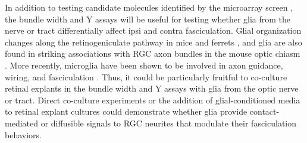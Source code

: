 In addition to testing candidate molecules identified by the microarray screen \cite{wang2016ipsilateral}, the bundle width and Y assays will be useful for testing whether glia from the nerve or tract differentially affect ipsi and contra fasciculation.
Glial organization changes along the retinogeniculate pathway in mice \cite{colello1992observations} and ferrets \cite{guillery1987changing}, and glia are also found in striking associations with RGC axon bundles in the mouse optic chiasm \cite{colello1998changing}.
More recently, microglia have been shown to be involved in axon guidance, wiring, and fasciculation \cite{squarzoni2014microglia,pont2014microglia}.
Thus, it could be particularly fruitful to co-culture retinal explants in the bundle width and Y assays with glia from the optic nerve or tract.
Direct co-culture experiments or the addition of glial-conditioned media to retinal explant cultures could demonstrate whether glia provide contact-mediated or diffusible signals to RGC neurites that modulate their fasciculation behaviors.
%

